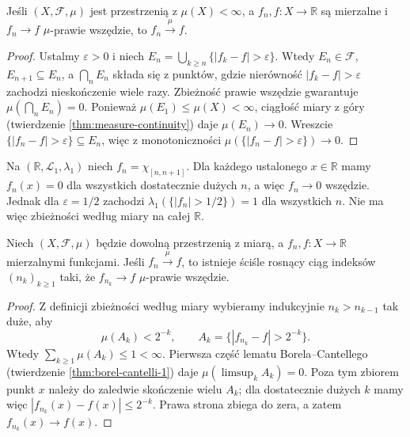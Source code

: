 \begin{twierdzenie}
\label{thm:ae-to-measure-finite}
Jeśli $(X,\mathcal F,\mu)$ jest przestrzenią
z $\mu(X)<\infty$, a $f_n,f:X\to\mathbb R$ są
mierzalne i $f_n\to f$ $\mu$-prawie wszędzie,
to $f_n\xrightarrow{\mu}f$.
\end{twierdzenie}
\begin{proof}
Ustalmy $\varepsilon>0$ i niech
$E_n=\bigcup_{k\ge n}\{|f_k-f|>\varepsilon\}$.
Wtedy $E_n\in\mathcal F$, $E_{n+1}\subseteq E_n$,
a $\bigcap_nE_n$ składa się z punktów, gdzie
nierówność $|f_k-f|>\varepsilon$ zachodzi
nieskończenie wiele razy. Zbieżność prawie wszędzie
gwarantuje $\mu(\bigcap_nE_n)=0$.
Ponieważ $\mu(E_1)\le\mu(X)<\infty$,
ciągłość miary z góry (twierdzenie
\ref{thm:measure-continuity}) daje $\mu(E_n)\to0$.
Wreszcie $\{|f_n-f|>\varepsilon\}\subseteq E_n$,
więc z monotoniczności $\mu(\{|f_n-f|>\varepsilon\})\to0$.
\end{proof}

\begin{przyklad}
\label{ex:aenotmeasure}
Na $(\mathbb R,\mathcal L_1,\lambda_1)$ niech
$f_n=\chi_{[n,n+1]}$. Dla każdego ustalonego
$x\in\mathbb R$ mamy $f_n(x)=0$ dla wszystkich
dostatecznie dużych $n$, a więc $f_n\to0$ wszędzie.
Jednak dla $\varepsilon=1/2$ zachodzi
$\lambda_1(\{|f_n|>1/2\})=1$ dla wszystkich $n$.
Nie ma więc zbieżności według miary na całej $\mathbb R$.
\end{przyklad}

\begin{twierdzenie}
\label{thm:measure-subsequence}
Niech $(X,\mathcal F,\mu)$ będzie dowolną przestrzenią
z miarą, a $f_n,f:X\to\mathbb R$ mierzalnymi funkcjami.
Jeśli $f_n\xrightarrow{\mu}f$, to istnieje ściśle
rosnący ciąg indeksów $(n_k)_{k\ge1}$ taki, że
$f_{n_k}\to f$ $\mu$-prawie wszędzie.
\end{twierdzenie}
\begin{proof}
Z definicji zbieżności według miary wybieramy
indukcyjnie $n_k>n_{k-1}$ tak duże, aby
\[
\mu(A_k)<2^{-k},\qquad
A_k=\{|f_{n_k}-f|>2^{-k}\}.
\]
Wtedy $\sum_{k\ge1}\mu(A_k)\le1<\infty$.
Pierwsza część lematu Borela--Cantellego
(twierdzenie \ref{thm:borel-cantelli-1})
daje $\mu(\limsup_k A_k)=0$.
Poza tym zbiorem punkt $x$ należy do zaledwie
skończenie wielu $A_k$; dla dostatecznie dużych $k$
mamy więc $|f_{n_k}(x)-f(x)|\le2^{-k}$.
Prawa strona zbiega do zera, a zatem
$f_{n_k}(x)\to f(x)$.
\end{proof}

